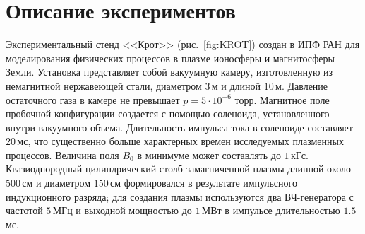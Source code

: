 \documentclass[autoref,10pt]{disser}
\begin{document}
\section{Описание экспериментов}
Экспериментальный стенд <<Крот>> (\mbox{рис.~\ref{fig:KROT}}) создан в ИПФ РАН для моделирования физических процессов в плазме ионосферы и магнитосферы Земли. Установка представляет собой вакуумную камеру, изготовленную из немагнитной нержавеющей стали, диаметром $3$\,м и длиной $10$\,м.  Давление остаточного газа в камере не превышает  $p = 5\cdot10^{-6}$ торр. 
Магнитное поле пробочной конфигурации создается с помощью соленоида, установленного внутри вакуумного объема. Длительность импульса тока в соленоиде составляет $20$\,мс, что существенно больше характерных времен исследуемых плазменных процессов. Величина поля $B_{0}$ в минимуме может составлять до $1$\,кГс.
Квазиоднородный цилиндрический столб замагниченной плазмы длинной около $500$\,см и диаметром $150$\,см формировался в результате импульсного индукционного разряда; для создания плазмы используются два ВЧ-генератора с частотой $5$\,МГц и выходной мощностью до $1$\,МВт в импульсе длительностью $1.5$\,мс.
\end{document}
